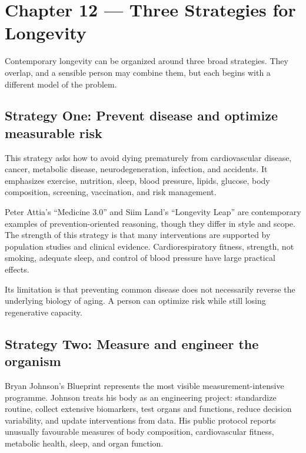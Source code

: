 \chapter{Chapter 12 --- Three Strategies for Longevity}\label{chapter-12-three-strategies-for-longevity}

Contemporary longevity can be organized around three broad strategies. They overlap, and a sensible person may combine them, but each begins with a different model of the problem.

\section{Strategy One: Prevent disease and optimize measurable risk}\label{strategy-one-prevent-disease-and-optimize-measurable-risk}

This strategy asks how to avoid dying prematurely from cardiovascular disease, cancer, metabolic disease, neurodegeneration, infection, and accidents. It emphasizes exercise, nutrition, sleep, blood pressure, lipids, glucose, body composition, screening, vaccination, and risk management.

Peter Attia's ``Medicine 3.0'' and Siim Land's ``Longevity Leap'' are contemporary examples of prevention-oriented reasoning, though they differ in style and scope. The strength of this strategy is that many interventions are supported by population studies and clinical evidence. Cardiorespiratory fitness, strength, not smoking, adequate sleep, and control of blood pressure have large practical effects.

Its limitation is that preventing common disease does not necessarily reverse the underlying biology of aging. A person can optimize risk while still losing regenerative capacity.

\section{Strategy Two: Measure and engineer the organism}\label{strategy-two-measure-and-engineer-the-organism}

Bryan Johnson's Blueprint represents the most visible measurement-intensive programme. Johnson treats his body as an engineering project: standardize routine, collect extensive biomarkers, test organs and functions, reduce decision variability, and update interventions from data. His public protocol reports unusually favourable measures of body composition, cardiovascular fitness, metabolic health, sleep, and organ function.

